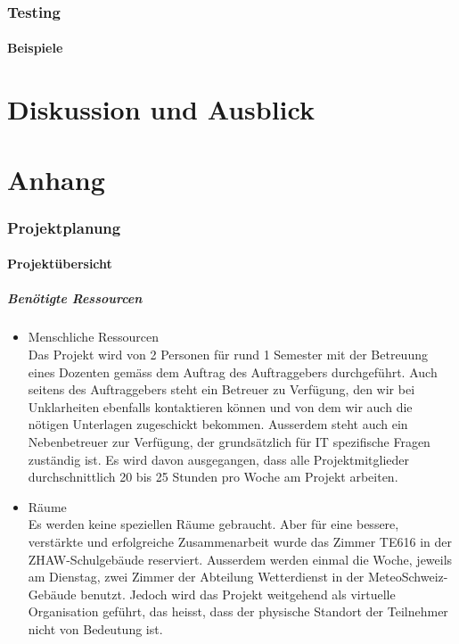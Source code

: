 \documentclass[a4paper,10pt]{article}
\begin{document}
\section{Testing}
\subsection{Beispiele}

\newpage
\part{Diskussion und Ausblick}

\newpage
\part{Anhang}

\section{Projektplanung}

\subsection{Projektübersicht}

\subsubsection{Benötigte Ressourcen}
\begin{itemize}
\item Menschliche Ressourcen \\
Das Projekt wird von 2 Personen für rund 1 Semester mit der Betreuung
eines Dozenten gemäss dem Auftrag des Auftraggebers durchgeführt. Auch
seitens des Auftraggebers steht ein Betreuer zu Verfügung, den wir bei
Unklarheiten ebenfalls kontaktieren können und von dem wir auch die
nötigen Unterlagen zugeschickt bekommen. Ausserdem steht auch ein
Nebenbetreuer zur Verfügung, der grundsätzlich für IT spezifische Fragen
zuständig ist. Es wird davon ausgegangen, dass alle Projektmitglieder
durchschnittlich 20 bis 25 Stunden pro Woche am Projekt arbeiten.

\item Räume \\
Es werden keine speziellen Räume gebraucht. Aber für eine bessere,
verstärkte und erfolgreiche Zusammenarbeit wurde das Zimmer TE616 in der
ZHAW-Schulgebäude reserviert. Ausserdem werden einmal die Woche, jeweils
am Dienstag, zwei Zimmer der Abteilung Wetterdienst in der
MeteoSchweiz-Gebäude benutzt. Jedoch wird das Projekt weitgehend als
virtuelle Organisation geführt, das heisst, dass der physische Standort
der Teilnehmer nicht von Bedeutung ist.

\end{itemize}
\end{document}
